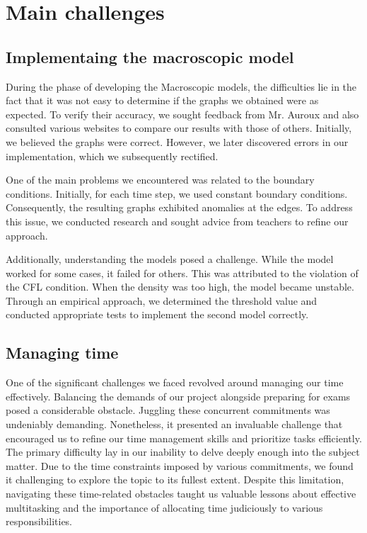 \documentclass{article}
\begin{document}
    \section{Main challenges}
	\subsection{Implementaing the macroscopic model}
		During the phase of developing the Macroscopic models, the difficulties lie in the fact that it was not easy to determine if the graphs we obtained were as expected. To verify their accuracy, we sought feedback from Mr. Auroux and also consulted various websites to compare our results with those of others. Initially, we believed the graphs were correct. However, we later discovered errors in our implementation, which we subsequently rectified.
		
		One of the main problems we encountered was related to the boundary conditions. Initially, for each time step, we used constant boundary conditions. Consequently, the resulting graphs exhibited anomalies at the edges. To address this issue, we conducted research and sought advice from teachers to refine our approach.
		
		Additionally, understanding the models posed a challenge. While the model worked for some cases, it failed for others. This was attributed to the violation of the CFL condition. When the density was too high, the model became unstable. Through an empirical approach, we determined the threshold value and conducted appropriate tests to implement the second model correctly.
	\subsection{Managing time}
		 One of the significant challenges we faced revolved around managing our time effectively. Balancing the demands of our project alongside preparing for exams posed a considerable obstacle. Juggling these concurrent commitments was undeniably demanding. Nonetheless, it presented an invaluable challenge that encouraged us to refine our time management skills and prioritize tasks efficiently. The primary difficulty lay in our inability to delve deeply enough into the subject matter. Due to the time constraints imposed by various commitments, we found it challenging to explore the topic to its fullest extent. Despite this limitation, navigating these time-related obstacles taught us valuable lessons about effective multitasking and the importance of allocating time judiciously to various responsibilities.
\end{document}
